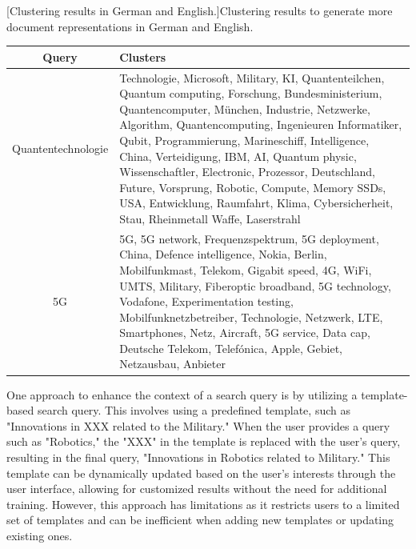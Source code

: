 \begin{center}
	[Clustering results in German and English.]{Clustering results to generate more document representations in German and English.}\label{tab:clustering_100_output}
	\begin{tabularx}{.99\textwidth}{|c|Y|}
		\hline
		Query & Clusters \\
		\hline
		
		Quantentechnologie     & Technologie, Microsoft, Military, KI, Quantenteilchen, Quantum computing, Forschung, Bundesministerium, Quantencomputer, München, Industrie, Netzwerke, Algorithm, Quantencomputing, Ingenieuren Informatiker, Qubit, Programmierung, Marineschiff, Intelligence, China, Verteidigung, IBM, AI, Quantum physic, Wissenschaftler, Electronic, Prozessor, Deutschland, Future, Vorsprung, Robotic, Compute, Memory SSDs, USA, Entwicklung, Raumfahrt, Klima, Cybersicherheit, Stau, Rheinmetall Waffe, Laserstrahl \\  \hline
		
		5G          & 5G, 5G network, Frequenzspektrum, 5G deployment, China, Defence intelligence, Nokia, Berlin, Mobilfunkmast, Telekom, Gigabit speed, 4G, WiFi, UMTS, Military, Fiberoptic broadband, 5G technology, Vodafone, Experimentation testing, Mobilfunknetzbetreiber, Technologie, Netzwerk, LTE, Smartphones, Netz, Aircraft, 5G service, Data cap, Deutsche Telekom, Telefónica, Apple, Gebiet, Netzausbau, Anbieter \\  \hline
		
		
		
	\end{tabularx}
	
\end{center}


One approach to enhance the context of a search query is by utilizing a template-based search query. This involves using a predefined template, such as "Innovations in XXX related to the Military."  When the user provides a query such as "Robotics," the "XXX" in the template is replaced with the user's query, resulting in the final query, "Innovations in Robotics related to Military." This template can be dynamically updated based on the user's interests through the user interface, allowing for customized results without the need for additional training. However, this approach has limitations as it restricts users to a limited set of templates and can be inefficient when adding new templates or updating existing ones.


